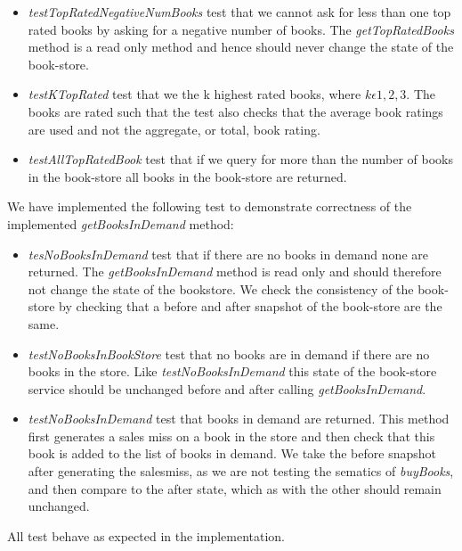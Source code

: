 \documentclass[a4paper]{article}
\begin{document}
\begin{itemize}
\item \textit{testTopRatedNegativeNumBooks} test that we cannot ask for less than one top rated books by asking for  a negative number of books. The \textit{getTopRatedBooks} method is a read only method and hence should never change the state of the book-store. 
\item \textit{testKTopRated} test that we the k highest rated books, where \(k\epsilon{1,2,3}\). The books are rated such that the test also checks that the average book ratings are used and not the aggregate, or total, book rating.
\item \textit{testAllTopRatedBook} test that if we query for more than the number of books in the book-store all books in the book-store are returned.
\end{itemize}
We have implemented the following test to demonstrate correctness of the implemented \textit{getBooksInDemand} method:
\begin{itemize}
\item \textit{tesNoBooksInDemand} test that if there are no books in demand none are returned. The \textit{getBooksInDemand} method is read only and should therefore not change the state of the bookstore. We check the consistency of the book-store by checking that a before and after snapshot of the book-store are the same.
\item \textit{testNoBooksInBookStore} test that no books are in demand if there are no books in the store. Like \textit{testNoBooksInDemand} this state of the book-store service should be unchanged before and after calling \textit{getBooksInDemand}.
\item \textit{testNoBooksInDemand} test that books in demand are returned. This method first generates a sales miss on a book in the store and then check that this book is added to the list of books in demand. We take the before snapshot after generating the salesmiss, as we are not testing the sematics of \textit{buyBooks}, and then compare to the after state, which as with the other should remain unchanged.
\end{itemize}
All test behave as expected in the implementation.
\end{document}
